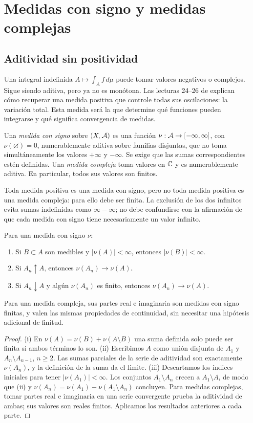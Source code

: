 \chapter{Medidas con signo y medidas complejas}\label{v2:cap12}\label{cap:v2-12}
\section{Aditividad sin positividad}\label{lectura:v2-24}
Una integral indefinida $A\mapsto\int_A f\,d\mu$ puede tomar valores negativos o complejos. Sigue siendo aditiva, pero ya no es monótona. Las lecturas 24--26 de \cite{valencia2} explican cómo recuperar una medida positiva que controle todas sus oscilaciones: la variación total. Esta medida será la que determine qué funciones pueden integrarse y qué significa convergencia de medidas.
\begin{definicion}
Una \emph{medida con signo} sobre $(X,\mathcal A)$ es una función $\nu:\mathcal A\to[-\infty,\infty]$, con $\nu(\varnothing)=0$, numerablemente aditiva sobre familias disjuntas, que no toma simultáneamente los valores $+\infty$ y $-\infty$. Se exige que las sumas correspondientes estén definidas. Una \emph{medida compleja} toma valores en $\mathbb C$ y es numerablemente aditiva. En particular, todos sus valores son finitos.
\end{definicion}
Toda medida positiva es una medida con signo, pero no toda medida positiva es una medida compleja: para ello debe ser finita. La exclusión de los dos infinitos evita sumas indefinidas como $\infty-\infty$; no debe confundirse con la afirmación de que cada medida con signo tiene necesariamente un valor infinito.
\begin{proposicion}\label{v2:continuidad-signo}
Para una medida con signo $\nu$:
\begin{enumerate}
\item Si $B\subset A$ son medibles y $|\nu(A)|<\infty$, entonces $|\nu(B)|<\infty$.
\item Si $A_n\uparrow A$, entonces $\nu(A_n)\to\nu(A)$.
\item Si $A_n\downarrow A$ y algún $\nu(A_n)$ es finito, entonces $\nu(A_n)\to\nu(A)$.
\end{enumerate}
Para una medida compleja, sus partes real e imaginaria son medidas con signo finitas, y valen las mismas propiedades de continuidad, sin necesitar una hipótesis adicional de finitud.
\end{proposicion}
\begin{proof}
(i) En $\nu(A)=\nu(B)+\nu(A\setminus B)$ una suma definida solo puede ser finita si ambos términos lo son. (ii) Escribimos $A$ como unión disjunta de $A_1$ y $A_n\setminus A_{n-1}$, $n\ge2$. Las sumas parciales de la serie de aditividad son exactamente $\nu(A_n)$, y la definición de la suma da el límite. (iii) Descartamos los índices iniciales para tener $|\nu(A_1)|<\infty$. Los conjuntos $A_1\setminus A_n$ crecen a $A_1\setminus A$, de modo que (ii) y $\nu(A_n)=\nu(A_1)-\nu(A_1\setminus A_n)$ concluyen. Para medidas complejas, tomar partes real e imaginaria en una serie convergente prueba la aditividad de ambas; sus valores son reales finitos. Aplicamos los resultados anteriores a cada parte.
\end{proof}
